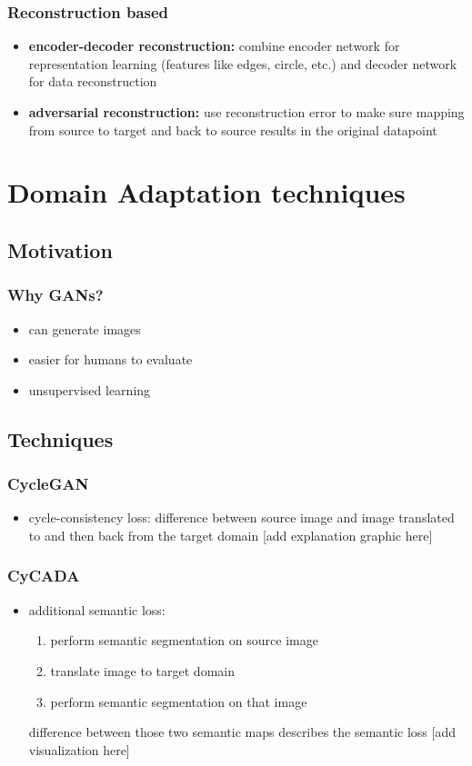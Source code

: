 \documentclass{beamer}
\begin{document}
\begin{frame}
\frametitle{Reconstruction based}
\begin{itemize}
	\item \textbf{encoder-decoder reconstruction:} combine encoder network for representation learning (features like edges, circle, etc.) and decoder network for data reconstruction
	\item \textbf{adversarial reconstruction:} use reconstruction error to make sure mapping from source to target and back to source results in the original datapoint
\end{itemize}
\end{frame}


\section{Domain Adaptation techniques}

\subsection{Motivation}
\begin{frame}
\frametitle{Why GANs?}
\begin{itemize}
	\item can generate images
	\item easier for humans to evaluate
	\item unsupervised learning
\end{itemize}
\end{frame}

\subsection{Techniques}

\begin{frame}
\frametitle{CycleGAN}
\begin{itemize}
	\item cycle-consistency loss: difference between source image and image translated to and then back from the target domain
	[add explanation graphic here]
\end{itemize}
\end{frame}

\begin{frame}
\frametitle{CyCADA}
\begin{itemize}
	\item additional semantic loss:
	\begin{enumerate}
		\item perform semantic segmentation on source image
		\item translate image to target domain
		\item perform semantic segmentation on that image
	\end{enumerate}
	difference between those two semantic maps describes the semantic loss
	[add visualization here]
\end{itemize}
\end{frame}
\end{document}
